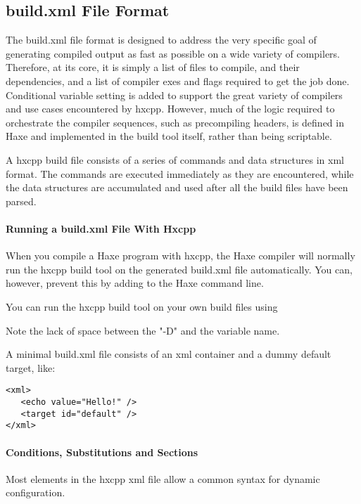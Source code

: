 \subsection{build.xml File Format}
\label{target-cpp-file-format}
The build.xml file format is designed to address the very specific goal of generating compiled output as fast as possible on a wide variety of compilers.  Therefore, at its core, it is simply a list of files to compile, and their dependencies, and a list of compiler exes and flags required to get the job done.  Conditional variable setting is added to support the great variety of compilers and use cases encountered by hxcpp.  However, much of the logic required to orchestrate the compiler sequences, such as precompiling headers, is defined in Haxe and implemented in the build tool itself, rather than being scriptable.

A hxcpp build file consists of a series of commands and data structures in xml format.  The commands are executed immediately as they are encountered, while the data structures are accumulated and used after all the build files have been parsed.

\paragraph{Running a build.xml File With Hxcpp}
When you compile a Haxe program with hxcpp, the Haxe compiler will normally run the hxcpp build tool on the generated build.xml file automatically.  You can, however, prevent this by adding  to the Haxe command line.

You can run the hxcpp build tool on your own build files using


Note the lack of space between the "-D" and the variable name.

A minimal build.xml file consists of an xml container and a dummy default target, like:
\begin{lstlisting}
<xml>
   <echo value="Hello!" />
   <target id="default" />
</xml>
\end{lstlisting}

\paragraph{Conditions, Substitutions and Sections}
Most elements in the hxcpp xml file allow a common syntax for dynamic configuration.

